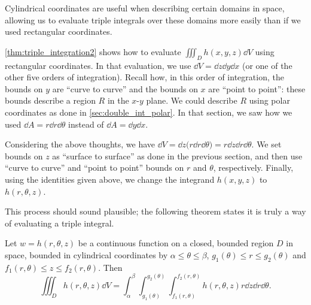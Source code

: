 Cylindrical coordinates are useful when describing certain domains in space, allowing us to evaluate triple integrals over these domains more easily than if we used rectangular coordinates.

\autoref{thm:triple_integration2} shows how to evaluate $\iiint_Dh(x,y,z)\dd V$ using rectangular coordinates. In that evaluation, we use $\dd V = \dd z\dd y\dd x$ (or one of the other five orders of integration). Recall how, in this order of integration, the bounds on $y$ are ``curve to curve'' and the bounds on $x$ are ``point to point'': these bounds describe a region $R$ in the $x$-$y$ plane. We could describe $R$ using polar coordinates as done in \autoref{sec:double_int_polar}. In that section, we saw how we used $\dd A = r\dd r\dd\theta$ instead of $\dd A = \dd y\dd x$. 

Considering the above thoughts, we have $\dd V = \dd z\bigl(r\dd r\dd\theta\bigr) = r\dd z\dd r\dd\theta$. We set bounds on $z$ as ``surface to surface'' as done in the previous section, and then use ``curve to curve'' and ``point to point'' bounds on $r$ and $\theta$, respectively. Finally, using the identities given above, we change the integrand $h(x,y,z)$ to $h(r,\theta,z)$.

This process should sound plausible; the following theorem states it is truly a way of evaluating a triple integral.

\begin{theorem}\label{thm:triple_int_cylindrical}
%
Let $w=h(r,\theta,z)$ be a continuous function on a closed, bounded region $D$ in space, bounded in cylindrical coordinates by $\alpha \leq \theta \leq \beta$, $g_1(\theta)\leq r \leq g_2(\theta)$ and $f_1(r,\theta) \leq z \leq f_2(r,\theta)$. Then  
\[
\iiint_D h(r,\theta,z)\dd V = \int_\alpha^\beta\int_{g_1(\theta)}^{g_2(\theta)}\int_{f_1(r,\theta)}^{f_2(r,\theta)}h(r,\theta,z) r\dd z\dd r\dd\theta.
\]
\end{theorem}


